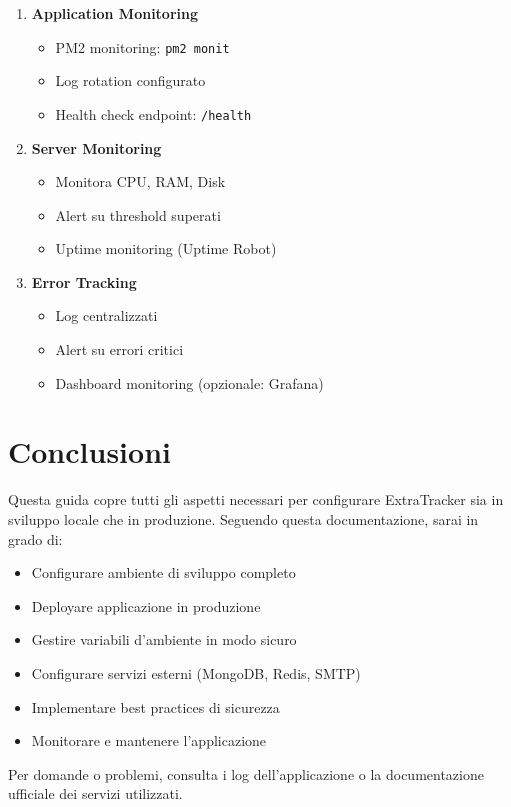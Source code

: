 \documentclass[11pt,a4paper]{article}
\newcommand{\code}[1]{\texttt{#1}}
\begin{document}
\begin{enumerate}
    \item \textbf{Application Monitoring}
    \begin{itemize}
        \item PM2 monitoring: \code{pm2 monit}
        \item Log rotation configurato
        \item Health check endpoint: \code{/health}
    \end{itemize}
    
    \item \textbf{Server Monitoring}
    \begin{itemize}
        \item Monitora CPU, RAM, Disk
        \item Alert su threshold superati
        \item Uptime monitoring (Uptime Robot)
    \end{itemize}
    
    \item \textbf{Error Tracking}
    \begin{itemize}
        \item Log centralizzati
        \item Alert su errori critici
        \item Dashboard monitoring (opzionale: Grafana)
    \end{itemize}
\end{enumerate}

\section{Conclusioni}

Questa guida copre tutti gli aspetti necessari per configurare ExtraTracker sia in sviluppo locale che in produzione. Seguendo questa documentazione, sarai in grado di:

\begin{itemize}
    \item Configurare ambiente di sviluppo completo
    \item Deployare applicazione in produzione
    \item Gestire variabili d'ambiente in modo sicuro
    \item Configurare servizi esterni (MongoDB, Redis, SMTP)
    \item Implementare best practices di sicurezza
    \item Monitorare e mantenere l'applicazione
\end{itemize}

Per domande o problemi, consulta i log dell'applicazione o la documentazione ufficiale dei servizi utilizzati.
\end{document}
